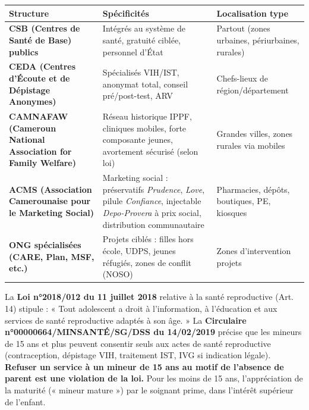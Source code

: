 \documentclass[11pt]{article}
\begin{document}
\begin{exemplebox}
\begin{center}
\begin{tabularx}{\linewidth}{|l|X|X|}\hline
\textbf{Structure} & \textbf{Spécificités} & \textbf{Localisation type} \\ \hline
\textbf{CSB (Centres de Santé de Base) publics} & Intégrés au système de santé, gratuité ciblée, personnel d'État & Partout (zones urbaines, périurbaines, rurales) \\ \hline
\textbf{CEDA (Centres d'Écoute et de Dépistage Anonymes)} & Spécialisés VIH/IST, anonymat total, conseil pré/post-test, ARV & Chefs-lieux de région/département \\ \hline
\textbf{CAMNAFAW (Cameroun National Association for Family Welfare)} & Réseau historique IPPF, cliniques mobiles, forte composante jeunes, avortement sécurisé (selon loi) & Grandes villes, zones rurales via mobiles \\ \hline
\textbf{ACMS (Association Camerounaise pour le Marketing Social)} & Marketing social : préservatifs \textit{Prudence}, \textit{Love}, pilule \textit{Confiance}, injectable \textit{Depo-Provera} à prix social, distribution communautaire & Pharmacies, dépôts, boutiques, PE, kiosques \\ \hline
\textbf{ONG spécialisées (CARE, Plan, MSF, etc.)} & Projets ciblés : filles hors école, UDPS, jeunes réfugiés, zones de conflit (NOSO) & Zones d'intervention projets \\ \hline
\end{tabularx}
\end{center}
\end{exemplebox}

\begin{attention}
La \textbf{Loi n°2018/012 du 11 juillet 2018} relative à la santé reproductive (Art. 14) stipule : « Tout adolescent a droit à l'information, à l'éducation et aux services de santé reproductive adaptés à son âge. » La \textbf{Circulaire n°00000664/MINSANTÉ/SG/DSS du 14/02/2019} précise que les mineurs de 15 ans et plus peuvent consentir seuls aux actes de santé reproductive (contraception, dépistage VIH, traitement IST, IVG si indication légale). \textbf{Refuser un service à un mineur de 15 ans au motif de l'absence de parent est une violation de la loi.} Pour les moins de 15 ans, l'appréciation de la maturité (« mineur mature ») par le soignant prime, dans l'intérêt supérieur de l'enfant.
\end{attention}
\end{document}
